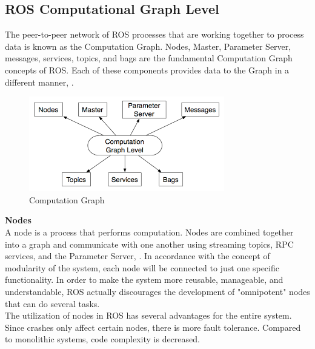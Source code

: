 \subsection{ROS Computational Graph Level}
The peer-to-peer network of ROS processes that are working together to process data is known as the Computation Graph. Nodes, Master, Parameter Server, messages, services, topics, and bags are the fundamental Computation Graph concepts of ROS. Each of these components provides data to the Graph in a different manner, \citet{rosconcepts}.\\
\begin{figure}[H]
    \centering
    \includegraphics[scale=0.8]{Images/Chapter 2/computationgraph.png}
    \caption{Computation Graph}
    \label{fig:computationgraph}
\end{figure}
\textbf{Nodes}\\
A node is a process that performs computation. Nodes are combined together into a graph and communicate with one another using streaming topics, RPC services, and the Parameter Server, \citet{rosnodes}. In accordance with the concept of modularity of the system, each node will be connected to just one specific functionality. In order to make the system more reusable, manageable, and understandable, ROS actually discourages the development of "omnipotent" nodes that can do several tasks. \\
The utilization of nodes in ROS has several advantages for the entire system. Since crashes only affect certain nodes, there is more fault tolerance. Compared to monolithic systems, code complexity is decreased. \\

